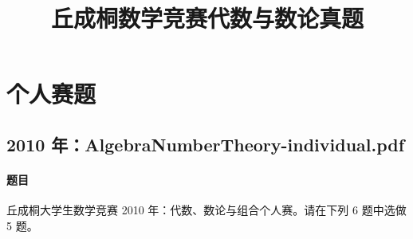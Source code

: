 \documentclass[UTF8,12pt]{ctexart}
\title{丘成桐数学竞赛代数与数论真题}
\author{}
\date{}
\begin{document}
\maketitle
\tableofcontents
\newpage

\section{个人赛题}





\subsection{2010 年：AlgebraNumberTheory-individual.pdf}
\paragraph{题目}
丘成桐大学生数学竞赛 2010 年：代数、数论与组合个人赛。请在下列 6 题中选做 5 题。
\end{document}
